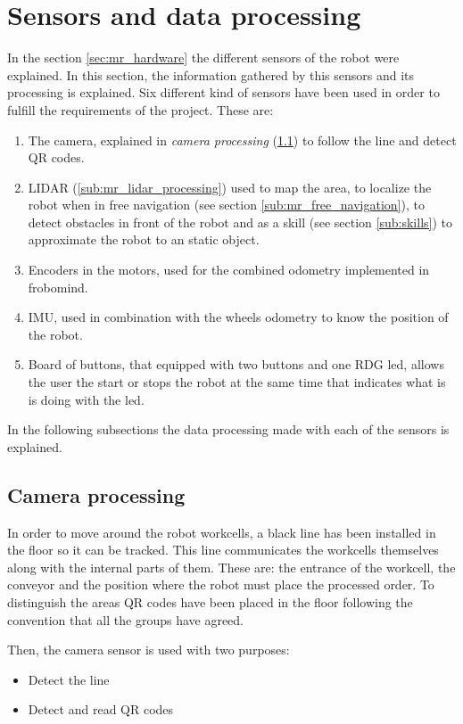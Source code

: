 \section{Sensors and data processing} %
\label{sec:mr_sensors_and_data_processing}
In the section \ref{sec:mr_hardware} the different sensors of the robot were explained.
In this section, the information gathered by this sensors and its processing is explained.
Six different kind of sensors have been used in order to fulfill the requirements of the project.
These are:
\begin{enumerate}
	\item The camera, explained in \emph{camera processing} (\ref{sub:mr_camera_processing}) to follow the line and detect QR codes.
	\item LIDAR (\ref{sub:mr_lidar_processing}) used to map the area, to localize the robot when in free navigation (see section \ref{sub:mr_free_navigation}), to detect obstacles in front of the robot and as a skill (see section \ref{sub:skills}) to approximate the robot to an static object.
	\item Encoders in the motors, used for the combined odometry implemented in frobomind.
	\item IMU, used in combination with the wheels odometry to know the position of the robot.
	\item Board of buttons, that equipped with two buttons and one RDG led, allows the user the start or stops the robot at the same time that indicates what is is doing with the led.
\end{enumerate}
In the following subsections the data processing made with each of the sensors is explained.

	\subsection{Camera processing} %
	\label{sub:mr_camera_processing}
	In order to move around the robot workcells, a black line has been installed in the floor so it can be tracked.
	This line communicates the workcells themselves along with the internal parts of them. 
	These are: the entrance of the workcell, the conveyor and the position where the robot must place the processed order.
	To distinguish the areas QR codes have been placed in the floor following the convention that all the groups have agreed.

	Then, the camera sensor is used with two purposes:
	\begin{itemize}
		\item Detect the line
		\item Detect and read QR codes
	\end{itemize}

